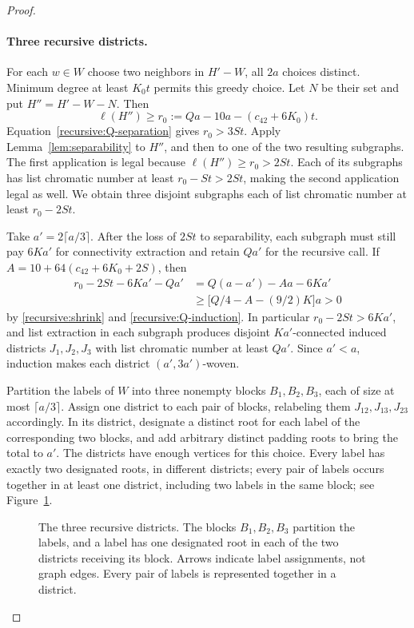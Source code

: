 \begin{proof}
\paragraph{Three recursive districts.}
For each $w\in W$ choose two neighbors in $H'-W$, all $2a$ choices
distinct. Minimum degree at least $K_0t$ permits this greedy choice.
Let $N$ be their set and put $H''=H'-W-N$. Then
\begin{equation}\label{recursive:r0}
 \ell(H'')\ge r_0:=Qa-10a-(c_{42}+6K_0)t.
\end{equation}
Equation~\eqref{recursive:Q-separation} gives $r_0>3St$.
Apply Lemma~\ref{lem:separability} to $H''$, and then to one of the two
resulting subgraphs. The first application is legal because
$\ell(H'')\ge r_0>2St$. Each of its subgraphs has list chromatic number
at least $r_0-St>2St$, making the second application legal as well.
We obtain three disjoint subgraphs each of list chromatic number at
least $r_0-2St$.

Take $a'=2\lceil a/3\rceil$. After the loss of $2St$ to separability,
each subgraph must still pay $6Ka'$ for connectivity extraction and
retain $Qa'$ for the recursive call. If
$A=10+64(c_{42}+6K_0+2S)$, then
\begin{align*}
 r_0-2St-6Ka'-Qa'
 &=Q(a-a')-Aa-6Ka'\\
 &\ge\bigl[Q/4-A-(9/2)K\bigr]a>0
\end{align*}
by \eqref{recursive:shrink} and \eqref{recursive:Q-induction}.
In particular $r_0-2St>6Ka'$, and list extraction in each subgraph
produces disjoint $Ka'$-connected induced districts $J_1,J_2,J_3$
with list chromatic number at least $Qa'$. Since $a'<a$, induction
makes each district $(a',3a')$-woven.

Partition the labels of $W$ into three nonempty blocks $B_1,B_2,B_3$,
each of size at most $\lceil a/3\rceil$. Assign one district to each
pair of blocks, relabeling them $J_{12},J_{13},J_{23}$ accordingly.
In its district, designate a distinct root for each
label of the corresponding two blocks, and add arbitrary distinct
padding roots to bring the total to $a'$. The districts have enough
vertices for this choice. Every label has exactly two designated roots,
in different districts; every pair of labels occurs together in at
least one district, including two labels in the same block; see
Figure~\ref{fig:three-districts}.

\begin{figure}[tb]
\centering

\caption{The three recursive districts. The blocks $B_1,B_2,B_3$ partition
the labels, and a label has one designated root in each of the two
districts receiving its block. Arrows indicate label assignments, not
graph edges. Every pair of labels is represented together in a district.}
\label{fig:three-districts}
\end{figure}


\end{proof}
